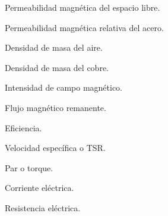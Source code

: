 \begin{description}
\item{ \makebox[2.2cm][l] {$[Wb/A \cdot m]$}} Permeabilidad magnética del espacio libre.
\item{ \makebox[2.2cm][l] { }} Permeabilidad magnética relativa del acero.
\item{\makebox[1.2cm][l]{$\rho$} \makebox[2.2cm][l] {$[kg/m^{3}]$}} Densidad de masa del aire.
\item{ \makebox[2.2cm][l] {$[kg/m^{3}]$}} Densidad de masa del cobre.
\item{ \makebox[2.2cm][l] {$[A/m]$}} Intensidad de campo magnético.
\item{ \makebox[2.2cm][l] {$[Wb]$}}  Flujo magnético remanente.
\item{\makebox[1.2cm][l]{$\eta$} \makebox[2.2cm][l] { }} Eficiencia.
\item{\makebox[1.2cm][l]{$\lambda$} \makebox[2.2cm][l] { }} Velocidad específica o TSR.
\item{ \makebox[2.2cm][l] {$[N \cdot m]$}} Par o torque.
\item{ \makebox[2.2cm][l] {$[A]$}} Corriente eléctrica.
\item{ \makebox[2.2cm][l] {$[\Omega]$}} Resistencia eléctrica.
\end{description}